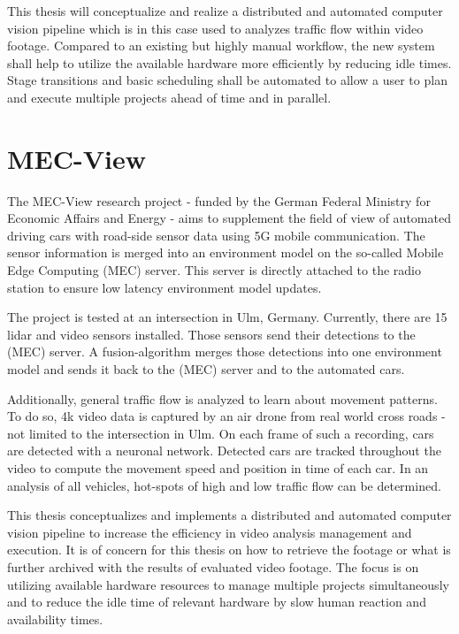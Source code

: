 This thesis will conceptualize and realize a distributed and automated computer vision pipeline which is in this case used to analyzes traffic flow within video footage.
Compared to an existing but highly manual workflow, the new system shall help to utilize the available hardware more efficiently by reducing idle times.
Stage transitions and basic scheduling shall be automated to allow a user to plan and execute multiple projects ahead of time and in parallel.



\newpage
\section{MEC-View}

The MEC-View research project\cite{mecview:main} - funded by the German Federal Ministry for Economic Affairs and Energy - aims to supplement the field of view of automated driving cars with road-side sensor data using 5G mobile communication. The sensor information is merged into an environment model on the so-called Mobile Edge Computing (MEC) server. This server is directly attached to the radio station to ensure low latency environment model updates.

The project is tested at an intersection in Ulm, Germany.
Currently, there are 15 lidar and video sensors installed.
Those sensors send their detections to the (MEC) server.
A fusion-algorithm merges those detections into one environment model and sends it back to the (MEC) server and to the automated cars.

Additionally, general traffic flow is analyzed to learn about movement patterns.
To do so, 4k video data is captured by an air drone from real world cross roads - not limited to the intersection in Ulm.
On each frame of such a recording, cars are detected with a neuronal network.
Detected cars are tracked throughout the video to compute the movement speed and position in time of each car.
In an analysis of all vehicles, hot-spots of high and low traffic flow can be determined.

This thesis conceptualizes and implements a distributed and automated computer vision pipeline to increase the efficiency in video analysis management and execution.
It is of concern for this thesis on how to retrieve the footage or what is further archived with the results of evaluated video footage.
The focus is on utilizing available hardware resources to manage multiple projects simultaneously and to reduce the idle time of relevant hardware by slow human reaction and availability times. 


